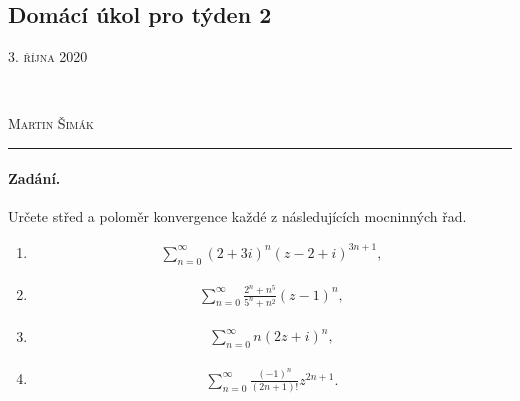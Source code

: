 \documentclass[11pt,a4paper]{article}
\begin{document}
	
	
	\begin{center}
		\section*{Domácí úkol pro týden 2}\vspace*{-5mm}
		\begin{minipage}{0.4\textwidth}
			\begin{flushleft}
				\textsc{3. října 2020}
			\end{flushleft}
		\end{minipage}
		~
		\begin{minipage}{0.4\textwidth}
			\begin{flushright}
				\textsc{Martin Šimák}
			\end{flushright}
		\end{minipage}
		\noindent\rule{14.5cm}{0.6pt}
	\end{center}
	
	\paragraph*{Zadání.} Určete střed a poloměr konvergence každé z následujících mocninných řad.
		\begin{multicols}{2}
			\begin{enumerate}[label=(\alph*)]
				
				\item
				\begin{align*}
					\sum_{n=0}^\infty (2+3i)^n(z-2+i)^{3n+1},
				\end{align*}
				
				\item
				\begin{align*}
					\sum_{n=0}^\infty \frac{2^n+n^5}{5^n+n^2} (z-1)^n,
				\end{align*}
				
				\item
				\begin{align*}
					\sum_{n=0}^\infty n(2z+i)^n,
				\end{align*}
				
				\item
				\begin{align*}
					\sum_{n=0}^\infty \frac{(-1)^n}{(2n+1)!} z^{2n+1}.
				\end{align*}
				
			\end{enumerate}
		\end{multicols}
	
\end{document}
